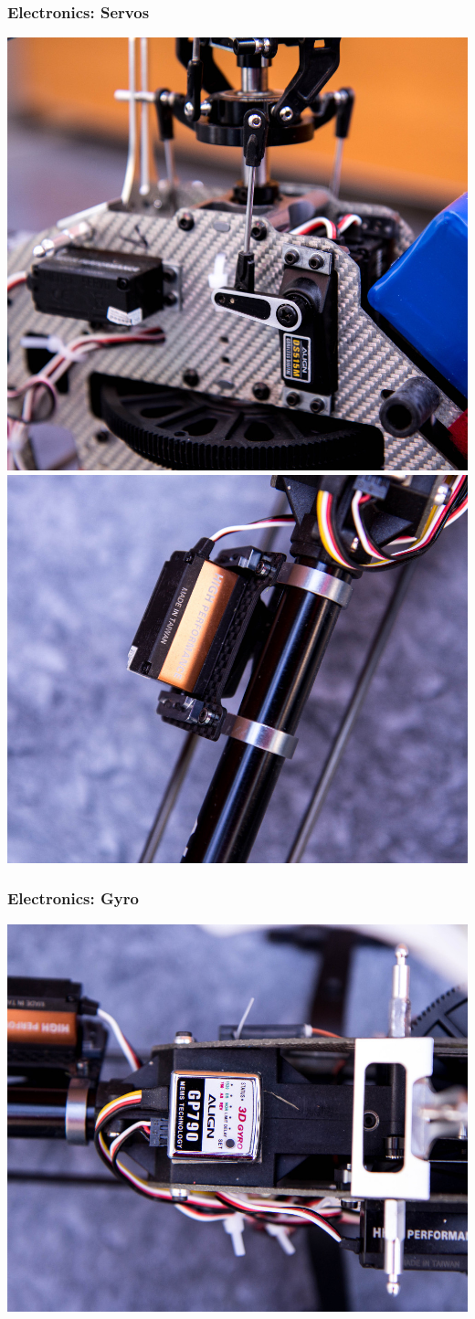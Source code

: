 \documentclass{beamer}
\begin{document}
\begin{frame}
\frametitle{Electronics: Servos}

\includegraphics[width=.5\textwidth]{images/IMG_0645_cropped_smaller}
\includegraphics[width=.5\textwidth]{images/IMG_0646_cropped_smaller}

\end{frame}

\begin{frame}
\frametitle{Electronics: Gyro}

\begin{center}
	\includegraphics[width=.7\textwidth]{images/IMG_0644_cropped_smaller}
\end{center}

\end{frame}
\end{document}

